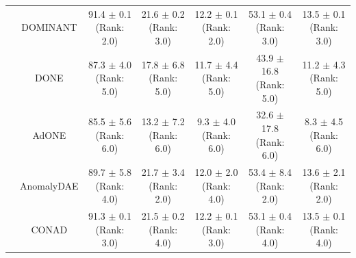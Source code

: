 \begin{table}[htbp]
{\begin{tabular}{|l|c|c|c|c|c|c|}
    & DOMINANT & \makecell{91.4 $\pm$ 0.1 \\[1pt] \tiny (Rank: 2.0)} & \makecell{21.6 $\pm$ 0.2 \\[1pt] \tiny (Rank: 3.0)} & \makecell{12.2 $\pm$ 0.1 \\[1pt] \tiny (Rank: 2.0)} & \makecell{53.1 $\pm$ 0.4 \\[1pt] \tiny (Rank: 3.0)} & \makecell{13.5 $\pm$ 0.1 \\[1pt] \tiny (Rank: 3.0)} \\
    & DONE & \makecell{87.3 $\pm$ 4.0 \\[1pt] \tiny (Rank: 5.0)} & \makecell{17.8 $\pm$ 6.8 \\[1pt] \tiny (Rank: 5.0)} & \makecell{11.7 $\pm$ 4.4 \\[1pt] \tiny (Rank: 5.0)} & \makecell{43.9 $\pm$ 16.8 \\[1pt] \tiny (Rank: 5.0)} & \makecell{11.2 $\pm$ 4.3 \\[1pt] \tiny (Rank: 5.0)} \\
    & AdONE & \makecell{85.5 $\pm$ 5.6 \\[1pt] \tiny (Rank: 6.0)} & \makecell{13.2 $\pm$ 7.2 \\[1pt] \tiny (Rank: 6.0)} & \makecell{9.3 $\pm$ 4.0 \\[1pt] \tiny (Rank: 6.0)} & \makecell{32.6 $\pm$ 17.8 \\[1pt] \tiny (Rank: 6.0)} & \makecell{8.3 $\pm$ 4.5 \\[1pt] \tiny (Rank: 6.0)} \\
    & AnomalyDAE & \makecell{89.7 $\pm$ 5.8 \\[1pt] \tiny (Rank: 4.0)} & \makecell{21.7 $\pm$ 3.4 \\[1pt] \tiny (Rank: 2.0)} & \makecell{12.0 $\pm$ 2.0 \\[1pt] \tiny (Rank: 4.0)} & \makecell{53.4 $\pm$ 8.4 \\[1pt] \tiny (Rank: 2.0)} & \makecell{13.6 $\pm$ 2.1 \\[1pt] \tiny (Rank: 2.0)} \\
    & CONAD & \makecell{91.3 $\pm$ 0.1 \\[1pt] \tiny (Rank: 3.0)} & \makecell{21.5 $\pm$ 0.2 \\[1pt] \tiny (Rank: 4.0)} & \makecell{12.2 $\pm$ 0.1 \\[1pt] \tiny (Rank: 3.0)} & \makecell{53.1 $\pm$ 0.4 \\[1pt] \tiny (Rank: 4.0)} & \makecell{13.5 $\pm$ 0.1 \\[1pt] \tiny (Rank: 4.0)} \\ \hline

\end{tabular}}
\end{table}
